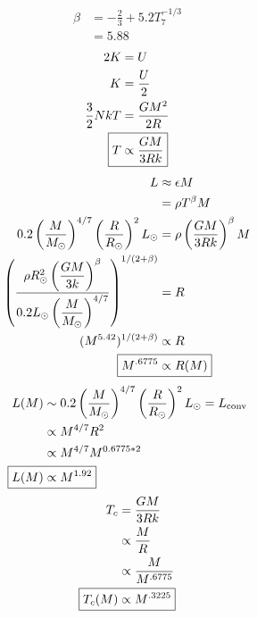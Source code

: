 \documentclass[10pt,letter,preprint]{aastex}
\begin{document}
\begin{align}
  \beta & = -\frac{2}{3} + 5.2 T_7^{-1/3}\\
  & = 5.88
\end{align}
\begin{align}
 2K& = U\\
  K & = \frac{U}{2}\\
  \frac{3}{2}NkT & = \frac{GM^2}{2R}\\
 \Aboxed{ T & \propto \frac{GM}{3Rk}}
\end{align}
\begin{align}
 L & \approx \epsilon M\\
  & = \rho T^\beta M\\
  0.2 \left( \frac{M}{M_\odot} \right)^{4/7} \left( \frac{R}{R_\odot} \right)^2 L_\odot & = \rho \left( \frac{GM}{3Rk} \right)^\beta M\\
  \left( \frac{\rho R_\odot^2 \left( \dfrac{GM}{3k} \right)^\beta }{0.2 L_\odot \left( \dfrac{M}{M_\odot} \right)^{4/7} } \right)^{1/(2 + \beta)} & = R\\
  (M^{5.42})^{1/(2+\beta)} & \propto R\\
\Aboxed{  M^{.6775} & \propto R(M)}
\end{align}
\begin{align}
  L(M) & \sim 0.2 \left( \frac{M}{M_\odot} \right)^{4/7} \left( \frac{R}{R_\odot} \right)^2 L_\odot = L_\text{conv}\\
  & \propto M^{4/7}R^2\\
  & \propto M^{4/7}M^{0.6775 * 2}\\
\Aboxed{L(M) & \propto M^{1.92}}
\end{align}
\begin{align}
  T_c & = \frac{GM}{3Rk}\\
  & \propto \frac{M}{R}\\
  & \propto \frac{M}{M^{.6775}}\\
\Aboxed{T_c(M) & \propto M^{.3225}}
\end{align}
\end{document}
